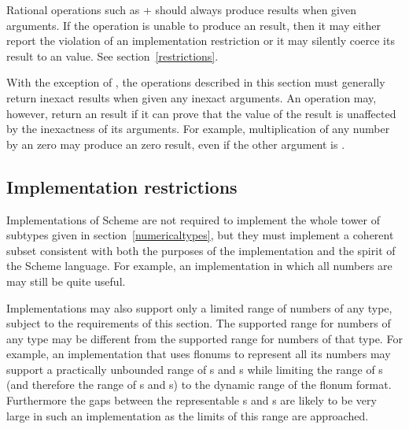 \vest Rational operations such as {\cf +} should always produce
 results when given  arguments.
If the operation is unable to produce an  result,
then it may either report the violation of an implementation restriction
or it may silently coerce its
result to an  value.
See section~\ref{restrictions}.

\vest With the exception of , the operations described in
this section must generally return inexact results when given any inexact
arguments.  An operation may, however, return an  result if it can
prove that the value of the result is unaffected by the inexactness of its
arguments.  For example, multiplication of any number by an  zero
may produce an  zero result, even if the other argument is
.

\subsection{Implementation restrictions}

\label{restrictions}

\vest Implementations of Scheme are not required to implement the whole
tower of subtypes given in section~\ref{numericaltypes},
but they must implement a coherent subset consistent with both the
purposes of the implementation and the spirit of the Scheme language.
For example, an implementation in which all numbers are 
may still be quite useful.

\vest Implementations may also support only a limited range of numbers of
any type, subject to the requirements of this section.  The supported
range for  numbers of any type may be different from the
supported range for  numbers of that type.  For example,
an implementation that uses flonums to represent all its
  numbers may
support a practically unbounded range of  s
and s
while limiting the range of  s (and therefore
the range of  s and s)
to the dynamic range of the flonum format.
Furthermore
the gaps between the representable  s and
s are
likely to be very large in such an implementation as the limits of this
range are approached.


